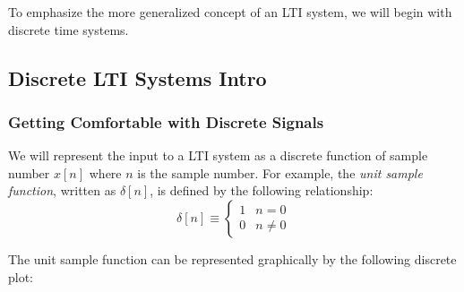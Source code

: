 \documentclass[a4paper]{article}
\numberwithin{equation}{section}
\begin{document}
\begin{center}
\end{center}



To emphasize the more generalized concept of an LTI system, we will begin with discrete time systems. 

\subsection{Discrete LTI Systems Intro}

\subsubsection{Getting Comfortable with Discrete Signals}
We will represent the input to a LTI system as a discrete function of sample number $ x [ n ] $ where $n$ is the sample number. For example, the \textit{unit sample function}, written as $\delta[n]$, is defined by the following relationship:
\begin{equation}
\delta [n] \equiv
\begin{cases} 
      1 & n=0 \\
      0 & n \neq 0
\end{cases}
\end{equation}


The unit sample function can be represented graphically by the following discrete plot:
\end{document}
